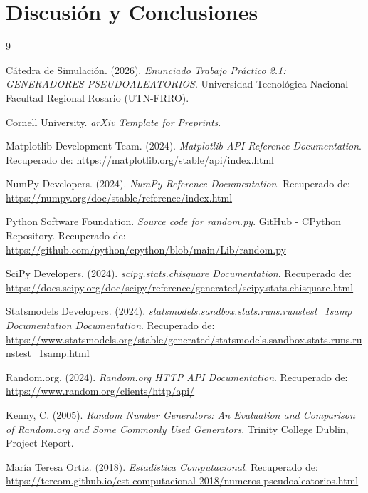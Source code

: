 \documentclass{article}
\begin{document}
\section{Discusión y Conclusiones}


\begin{thebibliography}{9}

  Cátedra de Simulación. (2026). \textit{Enunciado Trabajo Práctico 2.1: GENERADORES PSEUDOALEATORIOS}. Universidad Tecnológica Nacional - Facultad Regional Rosario (UTN-FRRO).

  Cornell University. \textit{arXiv Template for Preprints}.

  Matplotlib Development Team. (2024). \textit{Matplotlib API Reference Documentation}.
  Recuperado de: \url{https://matplotlib.org/stable/api/index.html}

  NumPy Developers. (2024). \textit{NumPy Reference Documentation}.
  Recuperado de: \url{https://numpy.org/doc/stable/reference/index.html}

  Python Software Foundation. \textit{Source code for random.py}. GitHub - CPython Repository.
  Recuperado de: \url{https://github.com/python/cpython/blob/main/Lib/random.py}

  SciPy Developers. (2024). \textit{scipy.stats.chisquare Documentation}.
  Recuperado de: \url{https://docs.scipy.org/doc/scipy/reference/generated/scipy.stats.chisquare.html}

  Statsmodels Developers. (2024). \textit{statsmodels.sandbox.stats.runs.runstest\_1samp Documentation Documentation}.
  Recuperado de: \url{https://www.statsmodels.org/stable/generated/statsmodels.sandbox.stats.runs.runstest_1samp.html}

  Random.org. (2024). \textit{Random.org HTTP API Documentation}.
  Recuperado de: \url{https://www.random.org/clients/http/api/}

  Kenny, C. (2005). \textit{Random Number Generators: An Evaluation and Comparison of Random.org and Some Commonly Used Generators}. Trinity College Dublin, Project Report.

  María Teresa Ortiz. (2018). \textit{Estadística Computacional}.
  Recuperado de: \url{https://tereom.github.io/est-computacional-2018/numeros-pseudoaleatorios.html}


\end{thebibliography}
\end{document}
